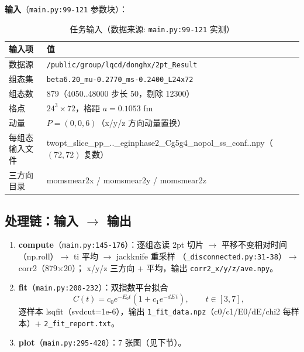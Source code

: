 \documentclass[UTF8]{ctexart}
\begin{document}
\textbf{输入}（\texttt{\nolinkurl{main.py:99-121}} 参数块）：
\begin{table}[htbp]\centering
\begin{tabularx}{\textwidth}{lX}
\toprule
输入项 & 值 \\
\midrule
数据源 & \texttt{\nolinkurl{/public/group/lqcd/donghx/2pt_Result}} \\
组态集 & \texttt{beta6.20\_mu-0.2770\_ms-0.2400\_L24x72} \\
组态数 & 879（4050..48000 步长 50，剔除 12300） \\
格点 & $24^3\times72$，格距 $a=0.1053$ fm \\
动量 & $P=(0,0,6)$（x/y/z 方向动量置换） \\
每组态输入文件 & twopt\_slice\_pp\_..\_eginphase2\_Cg5g4\_nopol\_ss\_conf..npy（$(72,72)$ 复数） \\
三方向目录 & momsmear2x / momsmear2y / momsmear2z \\
\bottomrule
\end{tabularx}
\caption{任务输入（数据来源: \texttt{\nolinkurl{main.py:99-121}} 实测）}
\end{table}

\subsection{处理链：输入 $\rightarrow$ 输出}
\begin{enumerate}
\item \textbf{compute}（\texttt{\nolinkurl{main.py:145-176}}）：逐组态读 2pt 切片 $\rightarrow$
  平移不变相对时间（np.roll）$\rightarrow$ ti 平均 $\rightarrow$ jackknife 重采样
  （\texttt{\nolinkurl{_disconnected.py:31-38}}）$\rightarrow$ corr2（879$\times$20）；
  x/y/z 三方向 + 平均，输出 \texttt{\nolinkurl{corr2\_x/y/z/ave.npy}}。
\item \textbf{fit}（\texttt{\nolinkurl{main.py:200-232}}）：双指数平台拟合
  \begin{equation}\label{eq:model}
    C(t) = c_0 e^{-E_0 t}\left(1 + c_1 e^{-dE\,t}\right),\qquad t\in[3,7],
  \end{equation}
  逐样本 lsqfit（svdcut=1e-6），输出 \texttt{\nolinkurl{1_fit_data.npz}}（c0/c1/E0/dE/chi2 每样本）+
  \texttt{\nolinkurl{2_fit_report.txt}}。
\item \textbf{plot}（\texttt{\nolinkurl{main.py:295-428}}）：7 张图（见下节）。
\end{enumerate}
\end{document}
